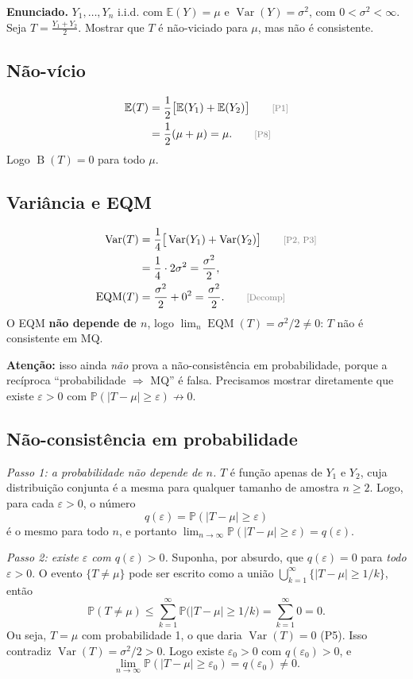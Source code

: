 \documentclass[11pt,a4paper]{article}
\newcommand{\E}{\mathbb{E}}
\newcommand{\Var}{\operatorname{Var}}
\newcommand{\EQM}{\operatorname{EQM}}
\newcommand{\B}{\operatorname{B}}
\newcommand{\Prob}{\mathbb{P}}
\newcommand{\just}[1]{\tag*{\footnotesize\textcolor{gray}{[#1]}}}
\begin{document}
\textbf{Enunciado.} $Y_1,\dots,Y_n$ i.i.d. com $\E(Y)=\mu$ e $\Var(Y)=\sigma^2$, com $0<\sigma^2<\infty$. Seja $T=\frac{Y_1+Y_2}{2}$. Mostrar que $T$ é não-viciado para $\mu$, mas não é consistente.

\subsection*{Não-vício}
\begin{align*}
\E(T)&=\frac12\big[\E(Y_1)+\E(Y_2)\big] \just{P1}\\
&=\frac12(\mu+\mu)=\mu . \just{P8}
\end{align*}
Logo $\B(T)=0$ para todo $\mu$.

\subsection*{Variância e EQM}
\begin{align*}
\Var(T)&=\frac14\big[\Var(Y_1)+\Var(Y_2)\big] \just{P2, P3}\\
&=\frac14\cdot2\sigma^2=\frac{\sigma^2}{2},\\
\EQM(T)&=\frac{\sigma^2}{2}+0^2=\frac{\sigma^2}{2}. \just{Decomp}
\end{align*}
O EQM \textbf{não depende de $n$}, logo $\lim_n\EQM(T)=\sigma^2/2\neq0$: $T$ não é consistente em MQ.

\begin{ideia}
\textbf{Atenção:} isso ainda \emph{não} prova a não-consistência em probabilidade, porque a recíproca ``probabilidade $\Rightarrow$ MQ'' é falsa. Precisamos mostrar diretamente que existe $\varepsilon>0$ com $\Prob(|T-\mu|\ge\varepsilon)\not\to0$.
\end{ideia}

\subsection*{Não-consistência em probabilidade}
\textit{Passo 1: a probabilidade não depende de $n$.} $T$ é função apenas de $Y_1$ e $Y_2$, cuja distribuição conjunta é a mesma para qualquer tamanho de amostra $n\ge2$. Logo, para cada $\varepsilon>0$, o número
\[
q(\varepsilon)=\Prob(|T-\mu|\ge\varepsilon)
\]
é o mesmo para todo $n$, e portanto $\lim_{n\to\infty}\Prob(|T-\mu|\ge\varepsilon)=q(\varepsilon)$.

\textit{Passo 2: existe $\varepsilon$ com $q(\varepsilon)>0$.} Suponha, por absurdo, que $q(\varepsilon)=0$ para \emph{todo} $\varepsilon>0$. O evento $\{T\neq\mu\}$ pode ser escrito como a união $\bigcup_{k=1}^\infty\{|T-\mu|\ge1/k\}$, então
\[
\Prob(T\ne\mu)\le\sum_{k=1}^\infty\Prob\big(|T-\mu|\ge1/k\big)=\sum_{k=1}^\infty0=0 .
\]
Ou seja, $T=\mu$ com probabilidade 1, o que daria $\Var(T)=0$ (P5). Isso contradiz $\Var(T)=\sigma^2/2>0$. Logo existe $\varepsilon_0>0$ com $q(\varepsilon_0)>0$, e
\[
\lim_{n\to\infty}\Prob(|T-\mu|\ge\varepsilon_0)=q(\varepsilon_0)\neq0 .
\]
\end{document}
